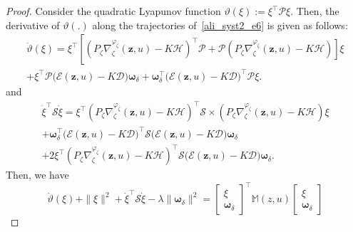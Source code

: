 %
\begin{proof}
Consider the quadratic Lyapunov function $\vartheta(\xi) := \xi^{\top} \mathcal{P} \xi$. Then, the derivative of $\vartheta(.)$ along the trajectories of~\eqref{ali_syst2_e6} is given as follows:
\begin{multline}\label{ali_thm_e1}
\dot{\vartheta}(\xi) = \xi^{\top} \left[ \left( P_{\zeta} \nabla^{\varphi_{\zeta}}_{\zeta}(\bm{z},u) - K  \mathcal{H} \right)^{\top} \mathcal{P}\right. 
+ \left. \mathcal{P} \left( P_{\zeta} \nabla^{\varphi_{\zeta}}_{\zeta}(\bm{z},u) - K  \mathcal{H} \right) \right] \xi \\
+  \xi^{\top} \mathcal{P} \Big( \mathcal{E}\left( \bm{z},u\right) - K  \mathcal{D}\Big) \bm{\omega}_{\delta} 
+  \bm{\omega}^{\top}_{\delta} \Big( \mathcal{E}\left( \bm{z},u\right) - K  \mathcal{D}\Big)^{\top} \mathcal{P} \xi .
\end{multline}
and
\begin{multline}\label{ali_thm_e2}
 \dot{\xi}^{\top} \mathcal{S} \dot{\xi}  = \xi^{\top} \left( P_{\zeta} \nabla^{\varphi_{\zeta}}_{\zeta}(\bm{z},u) - K  \mathcal{H} \right)^{\top} \mathcal{S} \times \left( P_{\zeta} \nabla^{\varphi_{\zeta}}_{\zeta}(\bm{z},u) - K  \mathcal{H} \right) \xi \\
+  \bm{\omega}^{\top}_{\delta} \Big( \mathcal{E}\left( \bm{z},u\right) - K  \mathcal{D}\Big)^{\top}\mathcal{S} \Big( \mathcal{E}\left( \bm{z},u\right) - K  \mathcal{D}\Big) \bm{\omega}_{\delta} \\
+ 2 \xi^{\top} \left( P_{\zeta} \nabla^{\varphi_{\zeta}}_{\zeta}(\bm{z},u) - K  \mathcal{H} \right)^{\top} \mathcal{S} \Big( \mathcal{E}\left( \bm{z},u\right) - K  \mathcal{D}\Big) \bm{\omega}_{\delta}.
\end{multline}
Then, we have
\begin{equation}\label{ali_thm_e3}
\dot{\vartheta}(\xi) + \| \xi \|^{2} + \dot{\xi}^{\top} \mathcal{S} \dot{\xi} - \lambda \| \bm{\omega}_{\delta} \|^{2} = \begin{bmatrix} \xi \\ \bm{\omega}_{\delta}\end{bmatrix}^{\top} \mathbb{M}\left( z,u \right) \begin{bmatrix} \xi \\ \bm{\omega}_{\delta}\end{bmatrix}

\end{equation}
\end{proof}
